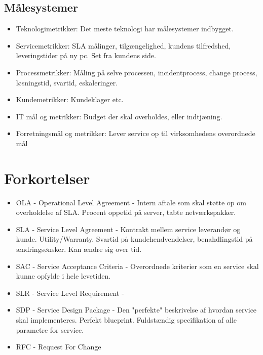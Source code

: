 \subsection{Målesystemer}
\begin{itemize}
\item Teknologimetrikker: Det meste teknologi har målesystemer indbygget.
\item Servicemetrikker: SLA målinger, tilgængelighed, kundens tilfredshed, leveringstider på ny pc. Set fra kundens side. 
\item Processmetrikker: Måling på selve processen, incidentprocess, change process, løsningstid, svartid, eskaleringer.
\item Kundemetrikker: Kundeklager etc.
\item IT mål og metrikker: Budget der skal overholdes, eller indtjæning.
\item Forretningsmål og metrikker: Lever service op til virksomhedens overordnede mål
\end{itemize}


























\section{Forkortelser}
\begin{itemize}
\item OLA - Operational Level Agreement - Intern aftale som skal støtte op om overholdelse af SLA. Procent oppetid på server, tabte netværkspakker.
\item SLA - Service Level Agreement - Kontrakt mellem service leverandør og kunde. Utility/Warranty. Svartid på kundehendvendelser, benahdlingstid på ændringsønsker. Kan ændre sig over tid.
\item SAC - Service Acceptance Criteria - Overordnede kriterier som en service skal kunne opfylde i hele levetiden.
\item SLR - Service Level Requirement - 
\item SDP - Service Design Package - Den "perfekte" beskrivelse af hvordan service skal implementeres. Perfekt blueprint. Fuldstændig specifikation af alle parametre for service.
\item RFC - Request For Change
\end{itemize}





%
%


